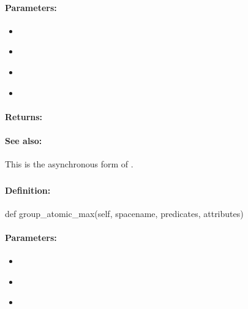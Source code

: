 \paragraph{Parameters:}
\begin{itemize}[noitemsep]
\item {}\\

\item {}\\

\item {}\\

\item {}\\

\end{itemize}

\paragraph{Returns:}


\paragraph{See also:}  This is the asynchronous form of .

\pagebreak
\subsubsection{}
\label{api:python:group_atomic_max}


\paragraph{Definition:}
\begin{pythoncode}
def group_atomic_max(self, spacename, predicates, attributes)
\end{pythoncode}

\paragraph{Parameters:}
\begin{itemize}[noitemsep]
\item {}\\

\item {}\\

\item {}\\

\end{itemize}

